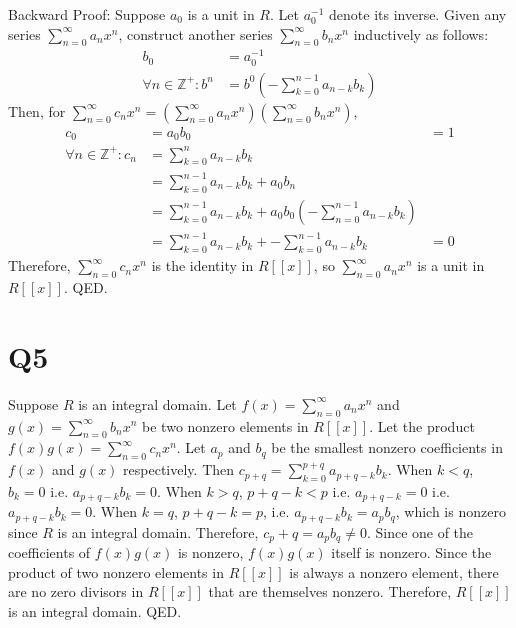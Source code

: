 \documentclass[]{article}
\begin{document}
	Backward Proof:\newline
	Suppose $a_0$ is a unit in $R$. Let $a_0^{-1}$ denote its inverse.\newline
	Given any series $\sum_{n=0}^{\infty} a_nx^n$, construct another series $\sum_{n=0}^{\infty} b_nx^n$ inductively as follows:
	\begin{align*}
	b_0 &= a_0^{-1}\\
	\forall n \in \mathbb{Z}^+: b^n &= b^0(-\sum_{k=0}^{n-1} a_{n-k}b_k)
	\end{align*}
	Then, for $\sum_{n=0}^{\infty} c_nx^n = (\sum_{n=0}^{\infty} a_nx^n)(\sum_{n=0}^{\infty} b_nx^n)$,\newline
	\begin{align*}
	c_0 &= a_0b_0 &= 1\\
	\forall n \in \mathbb{Z}^+: c_n &= \sum_{k=0}^{n} a_{n-k}b_k\\
	&= \sum_{k=0}^{n-1} a_{n-k}b_k + a_0b_n\\
	&= \sum_{k=0}^{n-1} a_{n-k}b_k + a_0b_0(-\sum_{n=0}^{n-1} a_{n-k}b_k)\\
	&= \sum_{k=0}^{n-1} a_{n-k}b_k + -\sum_{k=0}^{n-1} a_{n-k}b_k &= 0
	\end{align*}
	Therefore, $\sum_{n=0}^{\infty} c_nx^n$ is the identity in $R[[x]]$,\newline
	so $\sum_{n=0}^{\infty} a_nx^n$ is a unit in $R[[x]]$.\newline
	QED.

\section*{Q5}
	Suppose $R$ is an integral domain.\newline
	Let $f(x) = \sum_{n=0}^{\infty} a_nx^n$ and $g(x) = \sum_{n=0}^{\infty} b_nx^n$ be two nonzero elements in $R[[x]]$.\newline
	Let the product $f(x)g(x) = \sum_{n=0}^{\infty} c_nx^n$.\newline
	Let $a_p$ and $b_q$ be the smallest nonzero coefficients in $f(x)$ and $g(x)$ respectively.\newline
	Then $c_{p+q} = \sum_{k=0}^{p+q} a_{p+q-k}b_k$.\newline
	When $k < q$, $b_k = 0$ i.e. $a_{p+q-k}b_k = 0$.\newline
	When $k > q$, $p+q-k < p$ i.e. $a_{p+q-k} = 0$ i.e. $a_{p+q-k}b_k = 0$.\newline
	When $k = q$, $p+q-k = p$, i.e. $a_{p+q-k}b_k = a_pb_q$, which is nonzero since $R$ is an integral domain.\newline
	Therefore, $c_p+q = a_pb_q \not= 0$.\newline
	Since one of the coefficients of $f(x)g(x)$ is nonzero, $f(x)g(x)$ itself is nonzero.\newline
	Since the product of two nonzero elements in $R[[x]]$ is always a nonzero element, there are no zero divisors in $R[[x]]$ that are themselves nonzero.\newline
	Therefore, $R[[x]]$ is an integral domain.\newline
	QED.
	
	
\end{document}
